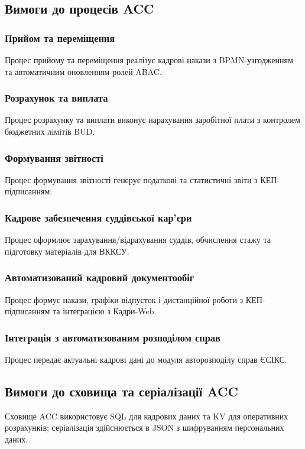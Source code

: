 \documentclass{article}
\begin{document}
\newpage
\subsection{Вимоги до процесів ACC}

\subsubsection{Прийом та переміщення}
Процес прийому та переміщення реалізує кадрові накази з BPMN-узгодженням та автоматичним оновленням ролей ABAC.

\subsubsection{Розрахунок та виплата}
Процес розрахунку та виплати виконує нарахування заробітної плати з контролем бюджетних лімітів BUD.

\subsubsection{Формування звітності}
Процес формування звітності генерує податкові та статистичні звіти з КЕП-підписанням.

\subsubsection{Кадрове забезпечення суддівської кар’єри}
Процес оформлює зарахування/відрахування суддів, обчислення стажу та підготовку матеріалів для ВККСУ.

\subsubsection{Автоматизований кадровий документообіг}
Процес формує накази, графіки відпусток і дистанційної роботи з КЕП-підписанням та інтеграцією з Кадри-Web.

\subsubsection{Інтеграція з автоматизованим розподілом справ}
Процес передає актуальні кадрові дані до модуля авторозподілу справ ЄСІКС.

\subsection{Вимоги до сховища та серіалізації ACC}
Сховище ACC використовує SQL для кадрових даних та KV для оперативних розрахунків; серіалізація здійснюється в JSON з шифруванням персональних даних.
\end{document}
